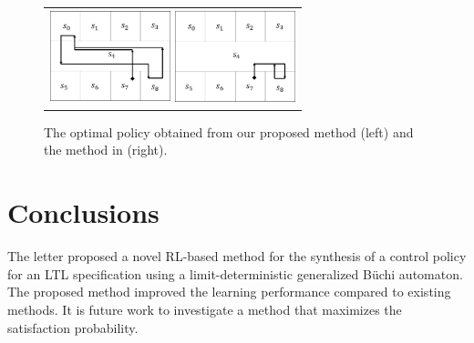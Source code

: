 \documentclass[letterpaper, 10 pt, conference]{ieeeconf}  %
\begin{document}
\begin{figure}[tbp]
	\centering
	\begin{tabular}{c}

		\begin{minipage}{0.499\hsize}
			\includegraphics[bb=0 0 341 256, height = 2.7cm, width=3.5cm]{proposed_policy.png}
		\end{minipage}

		\begin{minipage}{0.499\hsize}
			\centering
			\includegraphics[bb=0 0 341 257, height = 2.7cm, width=3.5cm]{Abate_policy.png}
		\end{minipage}
	\end{tabular}

	\caption{The optimal policy obtained from our proposed method (left) and the method in \cite{HAK2019, HKAKPL2019} (right).}
	\label{optimal}
\end{figure}

\section{Conclusions}

The letter proposed a novel RL-based method for the synthesis of a control policy for an LTL specification using a limit-deterministic generalized B\"{u}chi automaton.
The proposed method improved the learning performance compared to existing methods.
It is future work to investigate a method that maximizes the satisfaction probability.





\end{document}
